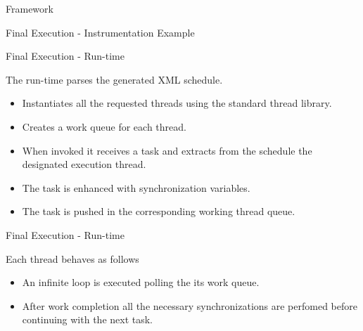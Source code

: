 \documentclass[xcolor=dvipsnames]{beamer}
\begin{document}
\begin{section}{Framework}
\begin{frame}[fragile]{\hskip 0.3cm Final Execution - Instrumentation Example}
\end{frame}








\begin{frame}{\hskip 0.3cm Final Execution - Run-time }

The run-time parses the generated XML schedule. 

\begin{itemize}

\item Instantiates all the requested threads using the standard thread library.

\item Creates a work queue for each thread.

\item When invoked it receives a task and extracts from the schedule the designated execution thread.

\item The task is enhanced with synchronization variables.

\item The task is pushed in the corresponding working  thread queue.

\end{itemize}

\end{frame}












\begin{frame}{\hskip 0.3cm Final Execution - Run-time}

Each thread behaves as follows

\begin{itemize}

\item An infinite loop is executed polling the its work queue.

\item After work completion all the necessary synchronizations are perfomed before continuing with the next task.

\end{itemize}


\end{frame}
\end{section}
\end{document}
